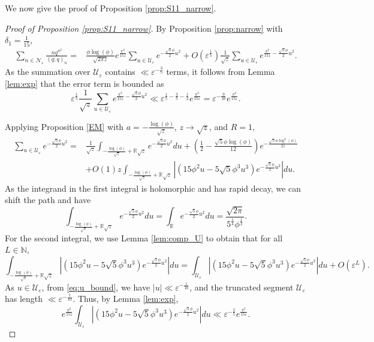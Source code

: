 \documentclass[11pt,reqno]{amsart}
\theoremstyle{remark}
\numberwithin{equation}{section}
\begin{document}
We now give the proof of Proposition \ref{prop:S11_narrow}.
\begin{proof}[Proof of Proposition \ref{prop:S11_narrow}]
By Proposition \ref{prop:narrow} with $\delta_1=\frac{1}{15}$,
\begin{align*}
	\sum_{n \in \mathcal{N}_{\varepsilon}} \frac{nq^{n^2}}{(q;q)_n} =& \frac{\phi \log(\phi) }{\sqrt{2\pi z}} e^{\frac{\pi^2}{15z} } \sum_{u \in \mathcal{U}_{\varepsilon}}e^{- \frac{\sqrt{5}\phi}{2}  u^2} + O\left( \varepsilon^{\frac{1}{5}}\right) \frac{1}{\sqrt{z}} \sum_{u \in \mathcal{U}_{\varepsilon}} e^{\frac{\pi^2}{15z} - \frac{\sqrt{5}\phi}{2}  u^2}.
\end{align*}
As the summation over $\mathcal{U}_{\varepsilon}$ contains $\ll \varepsilon^{-\frac35}$ terms, it follows from Lemma \ref{lem:exp} that the error term is bounded as
\[
	\varepsilon^{\frac15} \frac{1}{\sqrt{z}} \sum_{u \in \mathcal{U}_{\varepsilon}} e^{\frac{\pi^2}{15z} - \frac{\sqrt{5}\phi}{2}  u^2} \ll \varepsilon^{\frac15-\frac35-\frac12} e^{\frac{\pi^2}{15\varepsilon}}= \varepsilon^{-\frac{9}{10}} e^{\frac{\pi^2}{15\varepsilon}}.
\]


Applying Proposition \ref{EM} with $a=-\frac{\log (\phi)}{\sqrt{z}}$, $z\to \sqrt z$, and $R=1$,
\begin{align*}
	 \sum_{u\in \mathcal{U}_{\varepsilon}} e^{-\frac{\sqrt{5}\phi}{2}u^2} =& \frac{1}{\sqrt z} \int_{-\frac{\log (\phi)}{\sqrt{z}} + \mathbb{R}\sqrt{z}} e^{-\frac{\sqrt{5} \phi}{2}u^2} du + \left(\frac12 - \frac{\sqrt{5}\phi \log(\phi)}{12}\right) e^{-\frac{\sqrt{5} \phi \log^2(\phi)}{2z}} \\
	 &+ O(1)z \int_{-\frac{\log (\phi)}{\sqrt{z}} + \mathbb{R}\sqrt{z}} \left| \left(15\phi^2 u - 5\sqrt{5} \phi^3 u^3\right) e^{-\frac{\sqrt{5}\phi}{2}u^2} \right| du.
\end{align*}
As the integrand in the first integral is holomorphic and has rapid decay, we can shift the path and have
\[
	\int_{-\frac{\log (\phi)}{\sqrt{z}} + \mathbb{R}\sqrt{z}} e^{-\frac{\sqrt{5} \phi}{2}u^2} du  =  \int_{\mathbb{R}}  e^{-\frac{\sqrt{5} \phi}{2}u^2} du =\frac{ \sqrt{2\pi}}{5^{\frac14} \phi^{\frac12}}. 
\]
For the second integral, we use Lemma \ref{lem:comp_U} to obtain that for all $L \in \mathbb{N}$,
\[
	\int_{-\frac{\log (\phi)}{\sqrt{z}} + \mathbb{R}\sqrt{z}} \left| \left(15\phi^2 u - 5\sqrt{5} \phi^3 u^3\right) e^{-\frac{\sqrt{5}\phi}{2}u^2} \right| du = \int_{\mathcal{U}_{\varepsilon}} \left| \left(15\phi^2 u - 5\sqrt{5} \phi^3 u^3\right) e^{-\frac{\sqrt{5}\phi}{2}u^2} \right| du + O\left(\varepsilon^L\right).
\]
As $u\in \mathcal{U}_{\varepsilon}$, from \eqref{eq:u_bound}, we have $|u|\ll \varepsilon^{-\frac{1}{10}}$, and the truncated segment $\mathcal{U}_{\varepsilon}$ has length $\ll \varepsilon^{-\frac{1}{10}}$. Thus, by Lemma \ref{lem:exp},
\[
	e^{\frac{\pi^2}{15z} } \int_{\mathcal{U}_{\varepsilon}}  \left| \left(15\phi^2 u - 5\sqrt{5} \phi^3 u^3\right) e^{-\frac{\sqrt{5}\phi}{2}u^2} \right| du \ll \varepsilon^{-\frac25}e^{\frac{\pi^2}{15\varepsilon}}.
\]



\end{proof}
\end{document}
